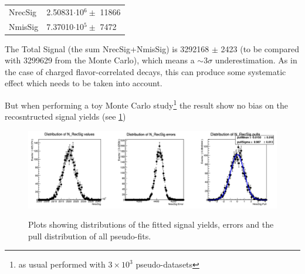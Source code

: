     \begin{tabular}{ |p{2.5cm}||p{4.2cm}|  }
        \hline
        NrecSig  & 2.50831$\cdot$10$^6 \pm$ 11866\\
        NmisSig &  7.37010$\cdot$10$^5 \pm$ 7472 \\
        \hline
       \end{tabular}
       
       
       \vspace{0.5 cm}
       \noindent The Total Signal (the sum  NrecSig+NmisSig) is 3292168 $\pm$ 2423 (to be compared with 3299629 from the Monte Carlo), which means a $\sim 3\sigma$ underestimation. As in the case of charged flavor-correlated decays, this can produce some systematic effect which needs to be taken into account.
       
       
But when performing a toy Monte Carlo study\footnote{as usual performed with  $3\times10^3$ pseudo-datasets} 
the result show no bias on the recosntructed signal yields (see \cref{fig:NrecSig_chargedAntiBtag_mcstudy})


\begin{figure}[H]
    \centering
    {\centering\includegraphics[width=14cm]{05-BtagFit/figs/NrecSig_chargedAntiBtag_mcstudy.png}}
    \caption{Plots showing distributions of the fitted signal yields, errors and the pull distribution of
    all pseudo-fits. }
    \label{fig:NrecSig_chargedAntiBtag_mcstudy}
    \end{figure}
                     


